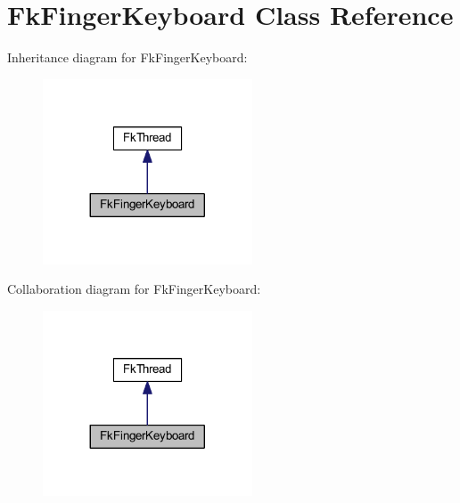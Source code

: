 \hypertarget{class_fk_finger_keyboard}{}\section{Fk\+Finger\+Keyboard Class Reference}
\label{class_fk_finger_keyboard}


Inheritance diagram for Fk\+Finger\+Keyboard\+:
\nopagebreak
\begin{figure}[H]
\begin{center}
\leavevmode
\includegraphics[width=176pt]{class_fk_finger_keyboard__inherit__graph}
\end{center}
\end{figure}


Collaboration diagram for Fk\+Finger\+Keyboard\+:
\nopagebreak
\begin{figure}[H]
\begin{center}
\leavevmode
\includegraphics[width=176pt]{class_fk_finger_keyboard__coll__graph}
\end{center}
\end{figure}
